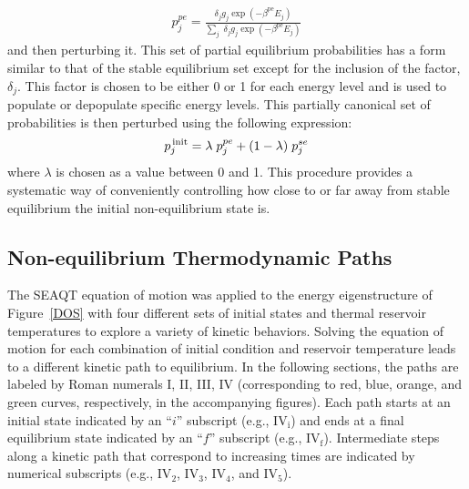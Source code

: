 \documentclass[
journal=jcisd8, %
manuscript=article,
layout=twocolumn   %
]{achemso}
\begin{document}
\begin{align}
p_j^{{pe}}=\frac {{\delta}_j g_j \exp(-\beta^{\text{pe}} E_j)}{\underset {j} {{\sum}}\phantom{l}{\delta}_j g_j \exp(-\beta^{\text{pe}} E_j)}
\label{PartCanDist}
\end{align}
and then perturbing it. This set of partial equilibrium probabilities has a form similar to that of the stable equilibrium set except for the inclusion of the factor, ${\delta}_j$. This factor is chosen to be either 0 or 1 for each energy level and is used to populate or depopulate specific energy levels. This partially canonical set of probabilities is then perturbed using the following expression:
\begin{align}
p_j^{\,\tiny \text{init}}= \lambda \; p_j^{{pe}} + (1-\lambda)\; p_j^{{se}}
\label{perturbed}
\end{align}
where $\lambda$ is chosen as a value between 0 and 1. This procedure provides a systematic way of conveniently controlling how close to or far away from stable equilibrium the initial non-equilibrium state is.


\subsection{Non-equilibrium Thermodynamic Paths}\label{SectionIID}

The SEAQT equation of motion was applied to the energy eigenstructure of Figure~\ref{DOS} with four different sets of initial states and thermal reservoir temperatures to explore a variety of kinetic behaviors. Solving the equation of motion for each combination of initial condition and reservoir temperature leads to a different kinetic path to equilibrium. In the following sections, the paths are labeled by Roman numerals I, II, III, IV (corresponding to red, blue, orange, and green curves, respectively, in the accompanying figures). Each path starts at an initial state indicated by an ``$i$'' subscript (e.g., IV$_\text{i}$) and ends at a final equilibrium state indicated by an ``$f$'' subscript (e.g.,  IV$_\text{f}$). Intermediate steps along a kinetic path that correspond to increasing times are indicated by numerical subscripts (e.g., IV$_2$, IV$_3$, IV$_4$, and IV$_5$). 
\end{document}
